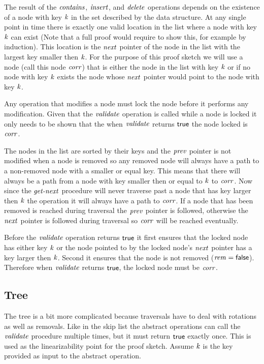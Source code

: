 The result of the $\ms{contains}$, $\ms{insert}$, and $\ms{delete}$ operations depends on the existence of
a node with key $\ms{k}$
in the set described by the data structure.
At any single point in time there is exactly one valid location in the list where a node with key $\ms{k}$ can exist
(Note that a full proof would require to show this, for example by induction).
This location is the $\ms{next}$ pointer of the node in the list with the largest key smaller then $\ms{k}$.
For the purpose of this proof sketch we will use a node (call this node $\ms{corr}$) that is either the node in the list
with key $\ms{k}$ or if no node with key $\ms{k}$ exists the node whose $\ms{next}$ pointer would point to the node with key $\ms{k}$.

Any operation that modifies a node must lock the node before it performs any modification.
Given that the $\ms{validate}$ operation is called while a node is locked it only needs to be shown
that the when $\ms{validate}$ returns $\lit{true}$ the node locked is $\ms{corr}$.

The nodes in the list are sorted by their keys and the $\ms{prev}$ pointer is not modified when a node is removed
so any removed node will always have a path to a non-removed node with a smaller or equal key.
This means that there will always be a path from a node with key smaller then or equal to $\ms{k}$ to $\ms{corr}$.
Now since the $\ms{get-next}$ procedure will never traverse past a node that has key larger then $\ms{k}$ the operation it will always have
a path to $\ms{corr}$.
If a node that has been removed is reached during traversal the $\ms{prev}$ pointer is followed, otherwise the $\ms{next}$ pointer
is followed during traversal so $\ms{corr}$ will be reached eventually.

Before the $\ms{validate}$ operation returns $\lit{true}$ it first ensures that the locked node has either key $\ms{k}$ or the node pointed
to by the locked node's $\ms{next}$ pointer has a key larger then $\ms{k}$.
Second it ensures that the node is not removed ($\ms{rem}=\lit{false}$).
Therefore when $\ms{validate}$ returns $\lit{true}$, the locked node must be $\ms{corr}$.

\subsection{Tree}
The tree is a bit more complicated because traversals have to deal with
rotations as well as removals.
Like in the skip list the abstract operations can call the $\ms{validate}$ procedure multiple times, but it must return $\lit{true}$ exactly once.
This is used as the linearizability point for the proof sketch.
Assume $\ms{k}$ is the key provided as input to the abstract operation.

